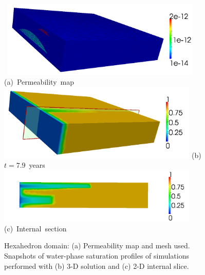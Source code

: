 
\begin{figure}[h]
\vbox{
\hbox{
\hspace{-0.cm}\includegraphics[width=0.85\textwidth]{./diagrams/3d_perm}}
\vspace{-0.cm}\hbox{\hspace{4cm}(a) Permeability map}
\vspace{.5cm}
\hbox{
\hspace{-0.cm}\includegraphics[width=0.85\textwidth]{./diagrams/3d_first}}
\vspace{-0.cm}\hbox{\hspace{4cm}(b) $t= 7.9$ years }
\vspace{.5cm}
\hbox{
\hspace{-.cm}\includegraphics[width=0.85\textwidth]{./diagrams/3d_second}}
\vspace{-0.cm}\hbox{\hspace{4cm}(c) Internal section }
}
\caption{Hexahedron domain: (a) Permeability map and mesh used. Snapshots of water-phase saturation profiles of simulations performed with  (b) 3-D solution and (c) 2-D internal slice.\label{fig:3d_perm}}
\end{figure}

